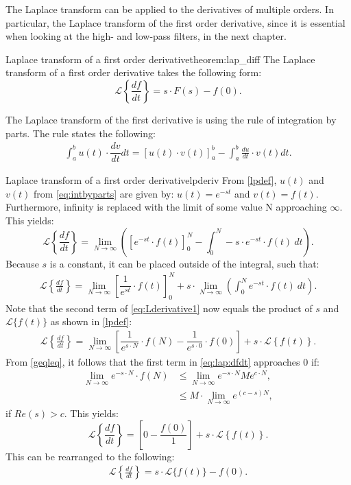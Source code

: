 \noindent The Laplace transform can be applied to the derivatives of multiple orders. In particular, the Laplace transform of the first order derivative, since it is essential when looking at the high- and low-pass filters, in the next chapter.
\\
\begin{theorem}{Laplace transform of a first order derivative}{theorem:lap_diff}
The Laplace transform of a first order derivative takes the following form: \cite[p.~332]{diffandcomplex}
$$\mathcal{L} \left\{\frac{df}{dt} \right\} = s \cdot F(s)-f(0).$$
\end{theorem}
\noindent The Laplace transform of the first derivative is using the rule of integration by parts. The rule states the following:
\begin{align}
\int_{a}^{b}{u(t) \cdot \dfrac{dv}{dt}dt}=\left[u(t) \cdot v(t) \right]_{a}^{b}-\int_{a}^{b} \frac{du}{dt}\cdot v(t) dt.
\label{eq:intbyparts}
\end{align}
\begin{prof}{Laplace transform of a first order derivative}{lpderiv}
From \cref{lpdef}, $u(t)$ and $v(t)$ from \eqref{eq:intbyparts} are given by: $u(t) = e^{-st}$ and $v(t) = f(t)$. Furthermore, infinity is replaced with the limit of some value N approaching $\infty$. This yields:
$$\mathcal{L} \left\{\frac{df}{dt} \right\}=\lim_{N \to \infty} \left(\left[e^{-st}\cdot f(t)\right]_{0}^{N}-\int_{0}^{N} -s\cdot e^{-st}\cdot f(t)\ dt \right).$$
Because $s$ is a constant, it can be placed outside of the integral, such that:
\begin{align}
\mathcal{L} \left\{\frac{df}{dt} \right\}=\lim_{N \to \infty} \left[\dfrac{1}{e^{st}}\cdot f(t)\right]_{0}^{N}+ s \cdot \lim_{N \to \infty} \left( \int_{0}^{N}e^{-st}\cdot f(t)\ dt \right).\label{eq:Lderivative1}
\end{align}
Note that the second term of \eqref{eq:Lderivative1} now equals the product of $s$ and $\mathcal{L}\{f(t)\}$ as shown in \cref{lpdef}:
\begin{align}
\mathcal{L} \left\{\frac{df}{dt} \right\} = \lim_{N \to \infty}\left[\dfrac{1}{e^{s\cdot N}}\cdot f(N)-\dfrac{1}{e^{s\cdot 0}}\cdot f(0)\right]+s\cdot \mathcal{L} \left\{f(t) \right\}. \label{eq:lap:dfdt}
\end{align}
From \cref{geqleq}, it follows that the first term in \eqref{eq:lap:dfdt} approaches $0$ if:
\begin{align*}
\lim_{N \to \infty} e^{-s\cdot N}\cdot f(N) &\leq \lim_{N \to \infty} e^{-s\cdot N} Me^{c\cdot N},\\
&\leq M \cdot \lim_{N \to \infty} e^{(c-s)N},
\end{align*}
if $Re(s) > c$. This yields:
$$\mathcal{L} \left\{\frac{df}{dt} \right\} = \left[0-\dfrac{f(0)}{1}\right]+s\cdot \mathcal{L} \left\{f(t) \right\}.$$
This can be rearranged to the following:
\begin{align*}
\mathcal{L} \left\{\frac{df}{dt} \right\} = s\cdot \mathcal{L}\{f(t)\}-f(0).
\end{align*}

\end{prof}
